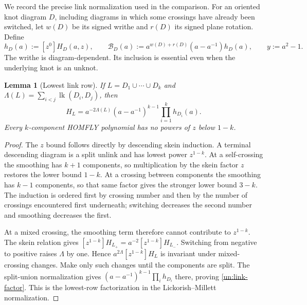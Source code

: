 \documentclass[11pt,letterpaper]{article}
\numberwithin{equation}{section}
\newtheorem{lemma}[theorem]{Lemma}
\theoremstyle{definition}
\theoremstyle{remark}
\begin{document}
We record the precise link normalization used in the comparison.  For
an oriented knot diagram $D$, including diagrams in which some crossings
have already been switched, let $w(D)$ be its signed writhe and $r(D)$
its signed plane rotation.  Define
\begin{equation}
 h_D(a):=[z^0]H_D(a,z),\qquad
 \mathcal B_D(a):=
 a^{w(D)+r(D)}(a-a^{-1})h_D(a),\qquad y:=a^2-1.
 \label{un:framed-definition}
\end{equation}
The writhe is diagram-dependent.  Its inclusion is essential even when
the underlying knot is an unknot.

\begin{lemma}[Lowest link row]
\label{un:lowest-link-row}
If $L=D_1\cup\cdots\cup D_k$ and
$\Lambda(L)=\sum_{i<j}\operatorname{lk}(D_i,D_j)$, then
\begin{equation}
 [z^{1-k}]H_L
 =a^{-2\Lambda(L)}(a-a^{-1})^{k-1}
     \prod_{i=1}^k h_{D_i}(a).
 \label{un:link-factor}
\end{equation}
Every $k$-component HOMFLY polynomial has no powers of $z$ below $1-k$.
\end{lemma}

\begin{proof}
The $z$ bound follows directly by descending skein induction.  A terminal
descending diagram is a split unlink and has lowest power $z^{1-k}$.
At a self-crossing the smoothing has $k+1$ components, so multiplication
by the skein factor $z$ restores the lower bound $1-k$.  At a crossing
between components the smoothing has $k-1$ components, so that same
factor gives the stronger lower bound $3-k$.  The induction is ordered
first by crossing number and then by the number of crossings encountered
first underneath; switching decreases the second number and smoothing
decreases the first.

At a mixed crossing, the smoothing term therefore cannot contribute to
$z^{1-k}$.  The skein relation gives
$[z^{1-k}]H_{L_+}=a^{-2}[z^{1-k}]H_{L_-}$.  Switching from negative to
positive raises $\Lambda$ by one.  Hence
$a^{2\Lambda}[z^{1-k}]H_L$ is invariant under mixed-crossing changes.
Make only such changes until the components are split.  The split-union
normalization gives $(a-a^{-1})^{k-1}\prod_i h_{D_i}$ there, proving
\eqref{un:link-factor}.  This is the lowest-row factorization in the
Lickorish--Millett normalization.
\end{proof}
\end{document}
